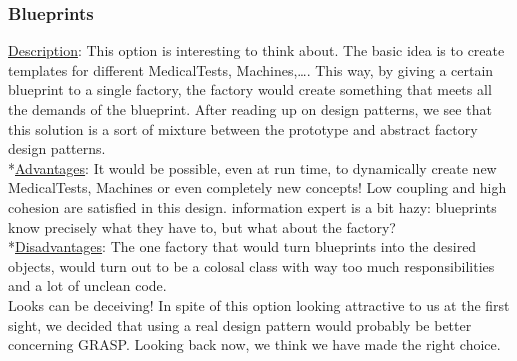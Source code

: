\documentclass[11pt]{article}
\begin{document}
\subsubsection{Blueprints}
\underline{Description}: This option is interesting to think about. The basic idea is to create templates for different MedicalTests, Machines,\dots. This way, by giving a certain blueprint to a single factory, the factory would create something that meets all the demands of the blueprint. After reading up on design patterns, we see that this solution is a sort of mixture between the prototype and abstract factory design patterns.
\\*\underline{Advantages}: It would be possible, even at run time, to dynamically create new MedicalTests, Machines or even completely new concepts! Low coupling and high cohesion are satisfied in this design. information expert is a bit hazy: blueprints know precisely what they have to, but what about the factory?
\\*\underline{Disadvantages}: The one factory that would turn blueprints into the desired objects, would turn out to be a colosal class with way too much responsibilities and a lot of unclean code.
\\Looks can be deceiving! In spite of this option looking attractive to us at the first sight, we decided that using a real design pattern would probably be better concerning GRASP. Looking back now, we think we have made the right choice.
\end{document}

